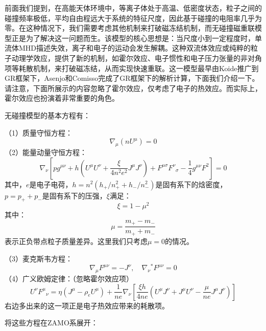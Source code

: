 \documentclass[lang=cn,color=blue,cm,11pt,scheme=chinese,bibend=bibtex,sorting=nty]{elegantbook}
\begin{document}
	前面我们提到，在高能天体环境中，等离子体处于高温、低密度状态，粒子之间的碰撞频率极低，平均自由程远大于系统的特征尺度，因此基于碰撞的电阻率几乎为零。在这种情况下，我们需要考虑其他机制来打破磁冻结机制，而无碰撞磁重联模型正是为了解决这一问题而生。该模型的核心思想是：当尺度小到一定程度时，单流体MHD描述失效，离子和电子的运动会发生解耦。这种双流体效应或纯粹的粒子动理学效应，提供了新的机制，如霍尔效应、电子惯性和电子压力张量的非对角项等耗散机制，来打破磁冻结，从而实现快速重联。这一模型最早由Koide推广到GR框架下，Asenjo和Comisso完成了GR框架下的解析计算，下面我们介绍一下。请注意，下面所展示的内容忽略了霍尔效应，仅考虑了电子的热效应。而实际上，霍尔效应也扮演着非常重要的角色。
	
	无碰撞模型的基本方程有：
	
	（1）质量守恒方程：
	\begin{equation}
		\nabla_{\mu} (n U^{\mu}) = 0
	\end{equation}
	（2）能量动量守恒方程：
	\begin{equation}
		\nabla_{\nu} \left[ p g^{\mu \nu} + h \left( U^{\mu} U^{\nu} + \frac{\xi}{4 n^2 e^2} J^{\mu} J^{\nu} \right) + F^{\mu \sigma} F^{\nu}{}_{\sigma} - \frac{1}{4} g^{\mu \nu} F^2 \right] = 0
	\end{equation}
	其中，$e$是电子电荷，$h = n^2 (h_+ / n_+^2 + h_- / n_-^2)$是固有系下的焓密度，$p = p_+ + p_-$是固有系下的压强，$\xi$满足：
	\begin{equation}
		\xi = 1 - \mu^2
	\end{equation}
	其中：
	\begin{equation}
		\mu = \frac{m_+ - m_-}{m_+ + m_-}
	\end{equation}
	表示正负带点粒子质量差异。这里我们只考虑$\mu = 0$的情况。
	
	（3）麦克斯韦方程：
	\begin{equation}
		\nabla_{\mu} F^{\mu \nu} = - J^{\nu}, \quad \nabla_{\nu} {}^{*}F^{\mu \nu} = 0
	\end{equation}
	（4）广义欧姆定律：（忽略霍尔效应项）
	\begin{equation}
		U^{\nu} F^{\mu}{}_{\nu} = \eta (J^{\mu} - \rho_e U^{\mu}) + \frac{1}{n e} \nabla_{\nu} \left[ \frac{\xi h}{4 n e} \left( U^{\mu} J^{\nu} + J^{\mu} U^{\nu} - \frac{\mu}{n e} J^{\mu} J^{\nu} \right) \right]
	\end{equation}
	右边多出来的这一项正是电子热效应带来的耗散项。
	
	将这些方程在ZAMO系展开：
	
\end{document}
